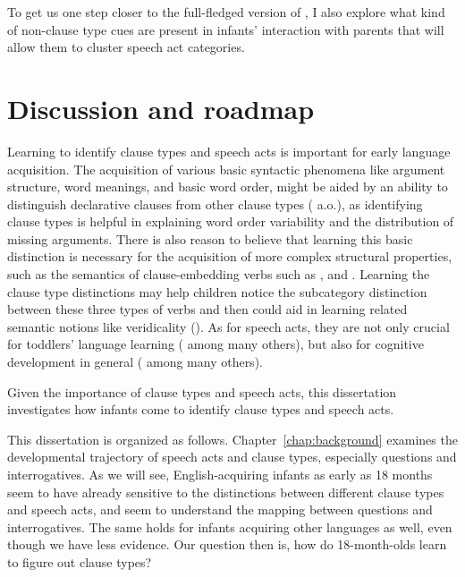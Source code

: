 To get us one step closer to the full-fledged version of \hypos{}, I also explore what kind of non-clause type cues are present in infants' interaction with parents that will allow them to cluster speech act categories. 




\section{Discussion and roadmap}
\label{sec:intro:roadmap}

Learning to identify clause types and speech acts is important for early language acquisition. The acquisition of various basic syntactic phenomena like argument structure, word meanings, and basic word order, might be aided by an ability to distinguish declarative clauses from other clause types (\citealt{pinker1984, pinker1989, gleitman1990, frankgoldwaterfrank2013, perkins2019} a.o.), as identifying clause types is helpful in explaining word order variability and the distribution of missing arguments. There is also reason to believe that learning this basic distinction is necessary for the acquisition of more complex structural properties, such as the semantics of clause-embedding verbs such as ,  and . Learning the clause type distinctions may help children notice the subcategory distinction between these three types of verbs and then could aid in learning related semantic notions like veridicality (\citealt{white2015diss, lewis2017think,dudley2017,hacquardlidz2018}). As for speech acts, they are not only crucial for toddlers' language learning (\citealt{ninio1980, hoff1985cds,yoder1994,rowland2003cdswh, valian2003cds, rowe2017wh, gaudreau2020q, gaudreau2021question} among many others), but also for cognitive development in general (\citealt{hohmann1995educating} among many others). 

Given the importance of clause types and speech acts, this dissertation investigates how infants come to identify clause types and speech acts. 


This dissertation is organized as follows. Chapter~\ref{chap:background} examines the developmental trajectory of speech acts and clause types, especially questions and interrogatives. As we will see, English-acquiring infants as early as 18 months seem to have already sensitive to the distinctions between different clause types and speech acts, and seem to understand the mapping between questions and interrogatives. The same holds for infants acquiring other languages as well, even though we have less evidence. Our question then is, how do 18-month-olds learn to figure out clause types?


